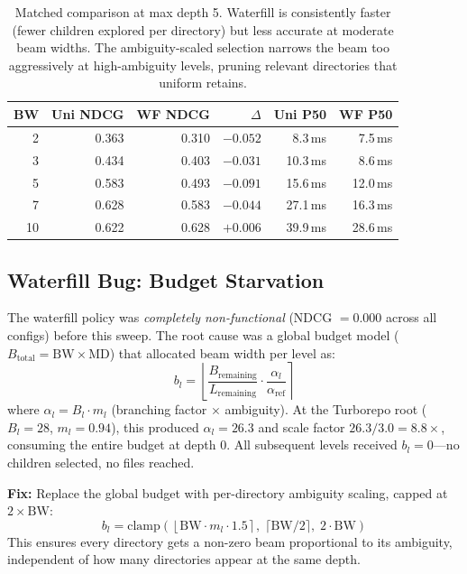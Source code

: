 \documentclass[11pt,a4paper]{article}
\begin{document}
\begin{table}[h]
\centering
\footnotesize
\begin{tabular}{rrrrrr}
\toprule
\textbf{BW} & \textbf{Uni NDCG} & \textbf{WF NDCG} & \textbf{$\Delta$} & \textbf{Uni P50} & \textbf{WF P50} \\
\midrule
2  & 0.363 & 0.310 & $-0.052$ & 8.3\,ms  & 7.5\,ms \\
3  & 0.434 & 0.403 & $-0.031$ & 10.3\,ms & 8.6\,ms \\
5  & 0.583 & 0.493 & $-0.091$ & 15.6\,ms & 12.0\,ms \\
7  & 0.628 & 0.583 & $-0.044$ & 27.1\,ms & 16.3\,ms \\
10 & 0.622 & 0.628 & $+0.006$ & 39.9\,ms & 28.6\,ms \\
\bottomrule
\end{tabular}
\caption{Matched comparison at max depth 5. Waterfill is consistently faster (fewer children explored per directory) but less accurate at moderate beam widths. The ambiguity-scaled selection narrows the beam too aggressively at high-ambiguity levels, pruning relevant directories that uniform retains.}
\end{table}

\subsection{Waterfill Bug: Budget Starvation}

The waterfill policy was \emph{completely non-functional} (NDCG $= 0.000$ across all configs) before this sweep.
The root cause was a global budget model ($B_{\mathrm{total}} = \mathrm{BW} \times \mathrm{MD}$) that allocated beam width per level as:
\[
b_l = \left\lfloor \frac{B_{\mathrm{remaining}}}{L_{\mathrm{remaining}}} \cdot \frac{\alpha_l}{\alpha_{\mathrm{ref}}} \right\rceil
\]
where $\alpha_l = B_l \cdot m_l$ (branching factor $\times$ ambiguity).
At the Turborepo root ($B_l = 28$, $m_l = 0.94$), this produced $\alpha_l = 26.3$ and scale factor $26.3 / 3.0 = 8.8\times$, consuming the entire budget at depth 0.
All subsequent levels received $b_l = 0$---no children selected, no files reached.

\textbf{Fix:} Replace the global budget with per-directory ambiguity scaling, capped at $2 \times \mathrm{BW}$:
\[
b_l = \mathrm{clamp}\!\left(\left\lfloor \mathrm{BW} \cdot m_l \cdot 1.5 \right\rceil,\; \lceil \mathrm{BW}/2 \rceil,\; 2 \cdot \mathrm{BW}\right)
\]
This ensures every directory gets a non-zero beam proportional to its ambiguity, independent of how many directories appear at the same depth.
\end{document}
